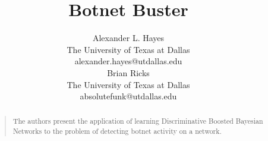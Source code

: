 \documentclass[letterpaper]{article}
\begin{document}
%
\title{Botnet Buster}
\author{Alexander L. Hayes\\
The University of Texas at Dallas\\
alexander.hayes@utdallas.edu\\
\And
Brian Ricks\\
The University of Texas at Dallas\\
absolutefunk@utdallas.edu\\
}

\maketitle
\begin{abstract}
\begin{quote}
The authors present the application of learning Discriminative Boosted Bayesian Networks to the problem of detecting botnet activity on a network.
\end{quote}
\end{abstract}



\end{document}
